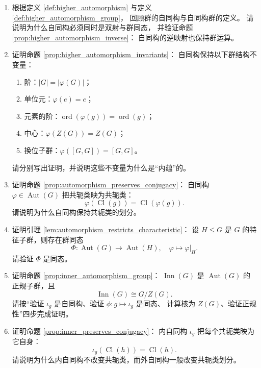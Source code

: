 \begin{enumerate}[leftmargin=3em, label=\textbf{题 \arabic*}]
    \item 根据定义 \ref{def:higher_automorphism} 与定义 \ref{def:higher_automorphism_group}，
    回顾群的自同构与自同构群的定义。
    请说明为什么自同构必须同时是双射与群同态，
    并验证命题 \ref{prop:higher_automorphism_inverse}：
    自同构的逆映射也保持群运算。

    \item 证明命题 \ref{prop:higher_automorphism_invariants}：
    自同构保持以下群结构不变量：
    \begin{enumerate}[label=(\roman*)]
        \item 阶：$|G|=|\varphi(G)|$；
        \item 单位元：$\varphi(e)=e$；
        \item 元素的阶：$\operatorname{ord}(\varphi(g))=\operatorname{ord}(g)$；
        \item 中心：$\varphi(Z(G))=Z(G)$；
        \item 换位子群：$\varphi([G,G])=[G,G]$。
    \end{enumerate}
    请分别写出证明，并说明这些不变量为什么是“内蕴”的。

    \item 证明命题 \ref{prop:automorphism_preserves_conjugacy}：
    自同构 $\varphi\in\operatorname{Aut}(G)$ 把共轭类映为共轭类：
    \[
    \varphi(\operatorname{Cl}(g))=\operatorname{Cl}(\varphi(g)).
    \]
    请说明为什么自同构保持共轭类的划分。

    \item 证明引理 \ref{lem:automorphism_restricts_characteristic}：
    设 $H\le G$ 是 $G$ 的特征子群，则存在群同态
    \[
    \Phi:\operatorname{Aut}(G)\to\operatorname{Aut}(H),\quad \varphi\mapsto\varphi|_H.
    \]
    请验证 $\Phi$ 是同态。

    \item 证明命题 \ref{prop:inner_automorphism_group}：
    $\operatorname{Inn}(G)$ 是 $\operatorname{Aut}(G)$ 的正规子群，且
    \[
    \operatorname{Inn}(G)\cong G/Z(G).
    \]
    请按“验证 $\iota_g$ 是自同构、验证 $\phi:g\mapsto\iota_g$ 是同态、
    计算核为 $Z(G)$、验证正规性”四步完成证明。

    \item 证明命题 \ref{prop:inner_preserves_conjugacy}：
    内自同构 $\iota_g$ 把每个共轭类映为它自身：
    \[
    \iota_g(\operatorname{Cl}(h))=\operatorname{Cl}(h).
    \]
    请说明为什么内自同构不改变共轭类，而外自同构一般改变共轭类划分。


\end{enumerate}
